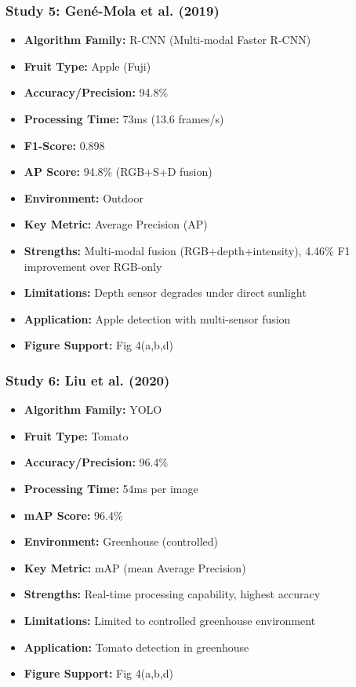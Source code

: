 \documentclass[11pt]{article}
\begin{document}
\subsubsection{Study 5: Gené-Mola et al. (2019) \cite{gene2019multi}}
\begin{itemize}
    \item \textbf{Algorithm Family:} R-CNN (Multi-modal Faster R-CNN)
    \item \textbf{Fruit Type:} Apple (Fuji)
    \item \textbf{Accuracy/Precision:} 94.8\%
    \item \textbf{Processing Time:} 73ms (13.6 frames/s)
    \item \textbf{F1-Score:} 0.898
    \item \textbf{AP Score:} 94.8\% (RGB+S+D fusion)
    \item \textbf{Environment:} Outdoor
    \item \textbf{Key Metric:} Average Precision (AP)
    \item \textbf{Strengths:} Multi-modal fusion (RGB+depth+intensity), 4.46\% F1 improvement over RGB-only
    \item \textbf{Limitations:} Depth sensor degrades under direct sunlight
    \item \textbf{Application:} Apple detection with multi-sensor fusion
    \item \textbf{Figure Support:} Fig 4(a,b,d)
\end{itemize}

\subsubsection{Study 6: Liu et al. (2020) \cite{liu2020yolo}}
\begin{itemize}
    \item \textbf{Algorithm Family:} YOLO
    \item \textbf{Fruit Type:} Tomato
    \item \textbf{Accuracy/Precision:} 96.4\%
    \item \textbf{Processing Time:} 54ms per image
    \item \textbf{mAP Score:} 96.4\%
    \item \textbf{Environment:} Greenhouse (controlled)
    \item \textbf{Key Metric:} mAP (mean Average Precision)
    \item \textbf{Strengths:} Real-time processing capability, highest accuracy
    \item \textbf{Limitations:} Limited to controlled greenhouse environment
    \item \textbf{Application:} Tomato detection in greenhouse
    \item \textbf{Figure Support:} Fig 4(a,b,d)
\end{itemize}
\end{document}

